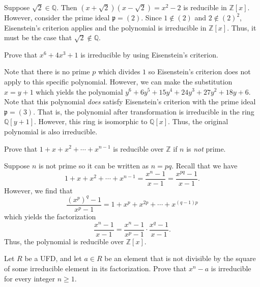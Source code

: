 \documentclass[../../master.tex]{subfiles}
\begin{document}
\begin{solution}
    Suppose $\sqrt{2} \in \mathbb{Q}$. 
    Then $(x + \sqrt{2}) (x - \sqrt{2}) = x^2 - 2$ is reducible in $\mathbb{Z}[x]$.
    However, consider the prime ideal $\mathfrak{p} = (2)$.
    Since $1 \notin (2)$ and $2 \notin (2)^2$, Eisenstein's criterion applies and the polynomial is irreducible in $\mathbb{Z}[x]$.
    Thus, it must be the case that $\sqrt{2} \notin \mathbb{Q}$.
\end{solution}

\begin{problem}
    Prove that $x^{6} + 4x^3 + 1$ is irreducible by using Eisenstein's criterion.
\end{problem}

\begin{solution}
    Note that there is no prime $p$ which divides $1$ so Eisenstein's criterion does not apply to this specific polynomial.
    However, we can make the substitution $x = y + 1$ which yields the polynomial $y^{6}+6y^{5}+15y^{4}+24y^3+27y^2+18y+6$.
    Note that this polynomial \textit{does} satisfy Eisenstein's criterion with the prime ideal $\mathfrak{p} = (3)$.
    That is, the polynomial after transformation is irreducible in the ring $\mathbb{Q}[y + 1]$.
    However, this ring is isomorphic to $\mathbb{Q}[x]$. 
    Thus, the original polynomial is also irreducible.
\end{solution}

\begin{problem}
    Prove that $1 + x + x^2 + \cdots + x^{n-1}$ is reducible over $\mathbb{Z}$ if $n$ is \textit{not} prime.
\end{problem}

\begin{solution}
    Suppose $n$ is not prime so it can be written as $n = pq$.
    Recall that we have
    \[
    1 + x + x^2 + \cdots + x^{n-1} = \frac{x^{n} - 1}{x - 1} = \frac{x^{pq} - 1}{x - 1}.
    \]
    However, we find that 
    \[
        \frac{(x^{p})^{q} - 1}{x^{p} - 1} = 1 + x^{p} + x^{2p} + \cdots + x^{(q-1)p}
    \]
    which yields the factorization
    \[
        \frac{x^{n} - 1}{x - 1} = \frac{x^{n} - 1}{x^{p} - 1} \cdot \frac{x^{q} - 1}{x - 1}.
    \]
    Thus, the polynomial is reducible over $\mathbb{Z}[x]$.
\end{solution}

\begin{problem}
    Let $R$ be a UFD, and let $a \in R$ be an element that is not divisible by the square of some irreducible element in its factorization.
    Prove that $x^{n} - a$ is irreducible for every integer $n \geq 1$.
\end{problem}
\end{document}
